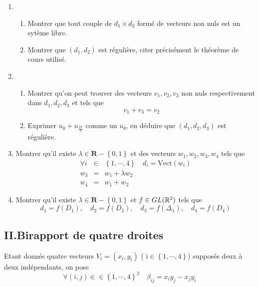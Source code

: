 \begin{enumerate}
\item
\begin{enumerate}
\item  Montrer que tout couple de $d_{1}\times d_{2}$ form{\'e} de vecteurs
non nuls est un syt{\`e}me libre.

\item  Montrer que $(d_{1},d_{2})$ est r{\'e}guli{\`e}re, citer
pr{\'e}cis{\'e}ment le th{\'e}or{\`e}me de cours utilis{\'e}.
\end{enumerate}

\item
\begin{enumerate}
\item  Montrer qu'on peut trouver des vecteurs $v_{1},v_{2},v_{3}$ non nuls
respectivement dans $d_{1},d_{2},d_{3}$ et tels que
\[
v_{1}+v_{3}=v_{2}
\]

\item  Exprimer $u_{0}+u_{\frac{2\pi }{3}}$ comme un $u_{\theta }$, en
d{\'e}duire que $(d_{1},d_{2},d_{3})$ est r{\'e}guli{\`e}re.
\end{enumerate}

\item  Montrer qu'il existe $\lambda \in \mathbf{R-}\left\{ 0,1\right\} $ et
des vecteurs $w_{1},w_{2},w_{3},w_{4}$ tels que
\begin{eqnarray*}
\forall i &\in &\left\{ 1,\cdots ,4\right\} \quad d_{i}=\text{Vect}(w_{i}) \\
w_{3} &=&w_{1}+\lambda w_{2} \\
w_{4} &=&w_{1}+w_{2}
\end{eqnarray*}

\item  Montrer qu'il existe $\lambda \in \mathbf{R-}\left\{ 0,1\right\} $ et
$f\in GL(\mathbb{R}^{2})$ tels que
\[
d_{1}=f(D_{1}),\quad d_{2}=f(D_{2}),\quad d_{3}=f(\Delta _{\lambda }),\quad
d_{4}=f(D_{4})
\]
\end{enumerate}

\subsection*{II.\qquad Birapport de quatre droites}

Etant donn{\'e}s quatre vecteurs $V_{i}=(x_{i},y_{i})$ ( i$\in \left\{
1,\cdots ,4\right\} $) suppos{\'e}s deux {\`a} deux ind{\'e}pendants, on
pose
\[
\forall (i,j)\in \in \left\{ 1,\cdots ,4\right\} ^{2}\quad \beta
_{ij}=x_{i}y_{j}-x_{j}y_{i}
\]

